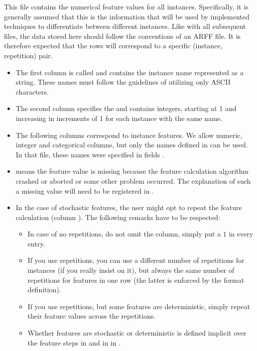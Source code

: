 This file contains the numerical feature values for all instances. Specifically, it is generally assumed that this is the
information that will be used by implemented techniques to differentiate between different instances. Like with all
subsequent files, the data stored here should follow the conventions of an ARFF file. It is therefore expected that the
rows will correspond to a specific (instance, repetition) pair.


\begin{itemize}
  	\item The first column is called  and contains the instance name represented as a string. 
		These names must follow the guidelines of utilizing only ASCII characters.
  	\item The second column specifies the  and contains integers, starting at 1 and increasing in 
  		increments of 1 for each instance with the same name.  
  	\item The following columns correspond to instance features. We allow numeric, integer and categorical columns,
		but only the names defined in  can be used. In that file, these names were specified 
		in fields .
 	 \item \qm means the feature value is missing because the feature calculation algorithm crashed or aborted or
    		some other problem occurred. The explanation of such a missing value will need to be registered in 
		.
  	\item In the case of stochastic features, the user might opt to repeat the feature calculation (column
		). The following remarks have to be respected: 
        		\begin{itemize}
          		\item In case of no repetitions, do not omit the column, simply put a $1$ in every 
                          entry. 
          		\item If you use repetitions, you can use a different number of repetitions for instances (if you 
				really insist on it), but always the same number of repetitions for features in one row
                			(the latter is enforced by the format definition). 
          		\item If you use repetitions, but some features are deterministic, simply repeat their feature values 
				across the repetitions.
          		\item Whether features are stochastic or deterministic is defined implicit over the feature steps 
          		in  and  in in .
        		\end{itemize} 
\end{itemize} 

